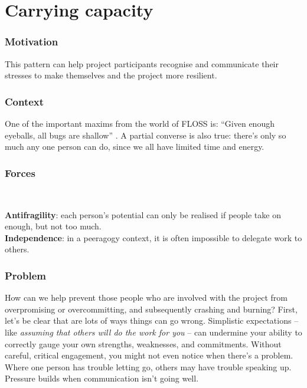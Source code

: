 \section{Carrying capacity}\label{sec:Carrying capacity}

\subsubsection*{Motivation} This pattern can help project participants recognise and communicate their stresses to make themselves and the project more resilient.

\subsubsection*{Context}

One of the important maxims from the world of FLOSS is: ``Given enough
eyeballs, all bugs are shallow'' \cite[p.~30]{raymond2001cathedral}.
A partial converse is also true: there's only so much any one person
can do, since we all have limited time and energy.

\subsubsection*{Forces}~
\parbox[t]{.85\textwidth}{
\textbf{Antifragility}: each person's potential can only be realised if people take on enough, but not too much.\\
\textbf{Independence}: in a peeragogy context, it is often impossible to delegate work to others.
}

\subsubsection*{Problem}

How can we help prevent those people who are involved with the project from overpromising or overcommitting, and subsequently crashing and burning?  First, let's be clear that are lots of ways things can go wrong.  Simplistic expectations -- like \emph{assuming that others will do the work for you} \cite{torvalds-interview} -- can undermine your ability to correctly gauge your own strengths, weaknesses, and commitments.  Without careful, critical engagement, you might not even notice when there's a problem.  Where one person has trouble letting go, others may have trouble speaking up.  Pressure builds when communication isn't going well.  

